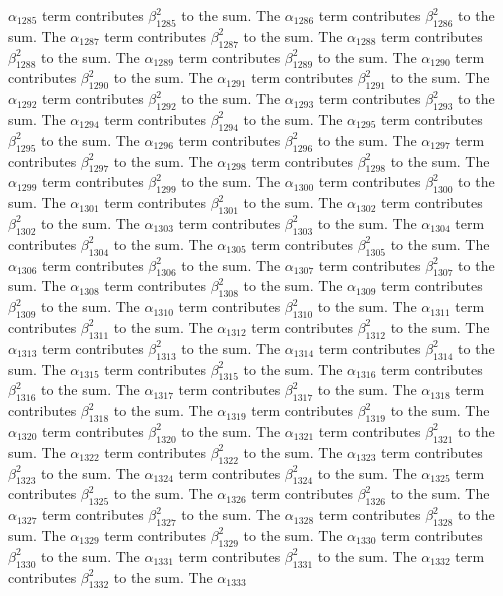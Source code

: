 \begin{lemma}
$\alpha_{1285}$ term contributes $\beta_{1285}^{2}$ to the sum. The $\alpha_{1286}$ term contributes $\beta_{1286}^{2}$ to the sum. The $\alpha_{1287}$ term contributes $\beta_{1287}^{2}$ to the sum. The $\alpha_{1288}$ term contributes $\beta_{1288}^{2}$ to the sum. The $\alpha_{1289}$ term contributes $\beta_{1289}^{2}$ to the sum. The $\alpha_{1290}$ term contributes $\beta_{1290}^{2}$ to the sum. The $\alpha_{1291}$ term contributes $\beta_{1291}^{2}$ to the sum. The $\alpha_{1292}$ term contributes $\beta_{1292}^{2}$ to the sum. The $\alpha_{1293}$ term contributes $\beta_{1293}^{2}$ to the sum. The $\alpha_{1294}$ term contributes $\beta_{1294}^{2}$ to the sum. The $\alpha_{1295}$ term contributes $\beta_{1295}^{2}$ to the sum. The $\alpha_{1296}$ term contributes $\beta_{1296}^{2}$ to the sum. The $\alpha_{1297}$ term contributes $\beta_{1297}^{2}$ to the sum. The $\alpha_{1298}$ term contributes $\beta_{1298}^{2}$ to the sum. The $\alpha_{1299}$ term contributes $\beta_{1299}^{2}$ to the sum. The $\alpha_{1300}$ term contributes $\beta_{1300}^{2}$ to the sum. The $\alpha_{1301}$ term contributes $\beta_{1301}^{2}$ to the sum. The $\alpha_{1302}$ term contributes $\beta_{1302}^{2}$ to the sum. The $\alpha_{1303}$ term contributes $\beta_{1303}^{2}$ to the sum. The $\alpha_{1304}$ term contributes $\beta_{1304}^{2}$ to the sum. The $\alpha_{1305}$ term contributes $\beta_{1305}^{2}$ to the sum. The $\alpha_{1306}$ term contributes $\beta_{1306}^{2}$ to the sum. The $\alpha_{1307}$ term contributes $\beta_{1307}^{2}$ to the sum. The $\alpha_{1308}$ term contributes $\beta_{1308}^{2}$ to the sum. The $\alpha_{1309}$ term contributes $\beta_{1309}^{2}$ to the sum. The $\alpha_{1310}$ term contributes $\beta_{1310}^{2}$ to the sum. The $\alpha_{1311}$ term contributes $\beta_{1311}^{2}$ to the sum. The $\alpha_{1312}$ term contributes $\beta_{1312}^{2}$ to the sum. The $\alpha_{1313}$ term contributes $\beta_{1313}^{2}$ to the sum. The $\alpha_{1314}$ term contributes $\beta_{1314}^{2}$ to the sum. The $\alpha_{1315}$ term contributes $\beta_{1315}^{2}$ to the sum. The $\alpha_{1316}$ term contributes $\beta_{1316}^{2}$ to the sum. The $\alpha_{1317}$ term contributes $\beta_{1317}^{2}$ to the sum. The $\alpha_{1318}$ term contributes $\beta_{1318}^{2}$ to the sum. The $\alpha_{1319}$ term contributes $\beta_{1319}^{2}$ to the sum. The $\alpha_{1320}$ term contributes $\beta_{1320}^{2}$ to the sum. The $\alpha_{1321}$ term contributes $\beta_{1321}^{2}$ to the sum. The $\alpha_{1322}$ term contributes $\beta_{1322}^{2}$ to the sum. The $\alpha_{1323}$ term contributes $\beta_{1323}^{2}$ to the sum. The $\alpha_{1324}$ term contributes $\beta_{1324}^{2}$ to the sum. The $\alpha_{1325}$ term contributes $\beta_{1325}^{2}$ to the sum. The $\alpha_{1326}$ term contributes $\beta_{1326}^{2}$ to the sum. The $\alpha_{1327}$ term contributes $\beta_{1327}^{2}$ to the sum. The $\alpha_{1328}$ term contributes $\beta_{1328}^{2}$ to the sum. The $\alpha_{1329}$ term contributes $\beta_{1329}^{2}$ to the sum. The $\alpha_{1330}$ term contributes $\beta_{1330}^{2}$ to the sum. The $\alpha_{1331}$ term contributes $\beta_{1331}^{2}$ to the sum. The $\alpha_{1332}$ term contributes $\beta_{1332}^{2}$ to the sum. The $\alpha_{1333}$ 
\end{lemma}
